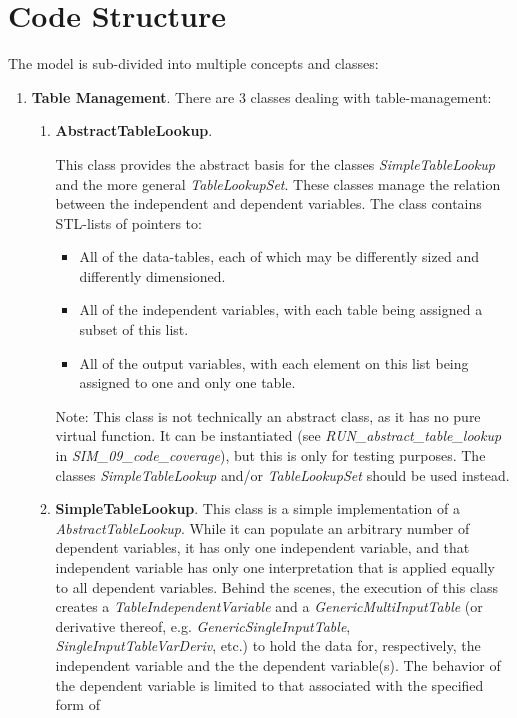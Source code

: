 \documentclass[11pt,fleqn]{report}
\begin{document}
\section{Code Structure}
The model is sub-divided into multiple concepts and classes:
\begin{enumerate}
 \item \textbf{Table Management}.  There are 3 classes dealing with
  table-management:
 \begin{enumerate}
  \item \textbf{AbstractTableLookup}.

  This class provides the abstract basis for the
   classes \textit{SimpleTableLookup} and the more general
   \textit{TableLookupSet}.  These classes manage the relation between the
   independent and dependent variables.
   The class contains STL-lists of pointers to:
   \begin{itemize}
    \item All of the data-tables, each of which may be differently sized and
     differently dimensioned.
    \item All of the independent variables, with each table being assigned a
         subset of this list.
    \item All of the output variables, with each element on this list being
          assigned to one and only one table.
   \end{itemize}
   Note:  This class is not technically an abstract class, as it has no pure virtual function.  It can be instantiated (see \textit{RUN\_abstract\_table\_lookup} in \textit{SIM\_09\_code\_coverage}), but this is only for testing purposes.  The classes \textit{SimpleTableLookup} and/or \textit{TableLookupSet} should be used instead.
  \item \textbf{SimpleTableLookup}.  This class is a simple implementation of a
   \textit{AbstractTableLookup}.  While it can populate
   an arbitrary number of dependent variables, it has only one
   independent variable, and that independent variable has only one
   interpretation that is applied equally to all dependent variables.
   Behind the scenes, the execution of this class creates a
   \textit{TableIndependentVariable} and a
   \textit{GenericMultiInputTable} (or derivative thereof, e.g.
   \textit{GenericSingleInputTable}, \textit{SingleInputTableVarDeriv}, etc.)
   to hold the data for, respectively, the
   independent variable and the the dependent variable(s).  The behavior of the
   dependent variable is limited to that associated with the specified form of

\end{enumerate}
\end{enumerate}
\end{document}
